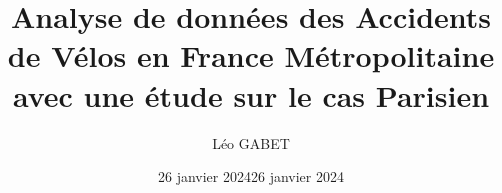 \documentclass[french,]{compterendu}
\title{Analyse de données des Accidents de Vélos en France Métropolitaine avec une étude sur le cas Parisien}
\author{Léo GABET}
\date{26 janvier 2024}
\date{26 janvier 2024}
\theoremstyle{urcastyle}
\theoremstyle{remark}
\begin{document}

\newtheorem{lemme}{Lemme}[section]
\newtheorem{theoreme}{Théorème}[section]
\newtheorem{corollaire}{Corollaire}[section]
\newtheorem{propriete}{Propriété}[section]
\newtheorem{proprietes}{Propriétés}[section]



\maketitle

% 
% 
\end{document}

